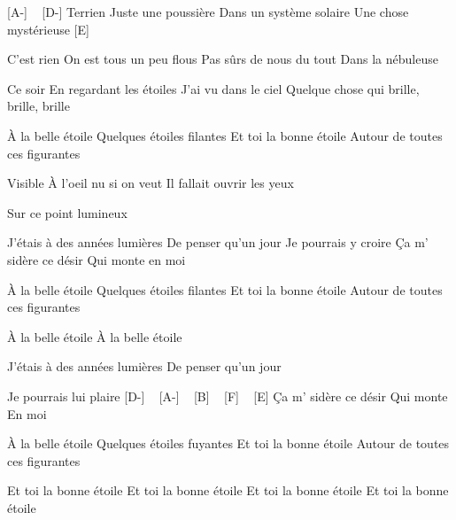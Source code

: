 
[A-] ~ [D-]
Terrien
Juste une poussière
Dans un système solaire
Une chose mystérieuse [E]


C'est rien
On est tous un peu flous
Pas sûrs de nous du tout
Dans la nébuleuse

Ce soir
En regardant les étoiles
J'ai vu dans le ciel
Quelque chose qui brille, brille, brille

À la belle étoile
Quelques étoiles filantes
Et toi la bonne étoile
Autour de toutes ces figurantes

Visible
À l'oeil nu si on veut
Il fallait ouvrir les yeux

Sur ce point lumineux

J'étais à des années lumières
De penser qu'un jour
Je pourrais y croire
Ça m' sidère ce désir
Qui monte en moi

À la belle étoile
Quelques étoiles filantes
Et toi la bonne étoile
Autour de toutes ces figurantes

À la belle étoile
À la belle étoile

J'étais à des années lumières
De penser qu'un jour

Je pourrais lui plaire
[D-] ~ [A-] ~ [B] ~ [F] ~ [E]
Ça m' sidère ce désir
Qui monte
En moi

À la belle étoile
Quelques étoiles fuyantes
Et toi la bonne étoile
Autour de toutes ces figurantes

Et toi la bonne étoile
Et toi la bonne étoile
Et toi la bonne étoile
Et toi la bonne étoile 